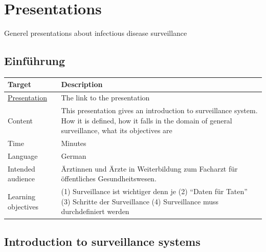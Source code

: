\documentclass[
  letterpaper,
  DIV=11,
  numbers=noendperiod]{scrreprt}
\begin{document}
\chapter*{Presentations}\label{presentations}


Generel presentations about infectious disease surveillance

\hfill\break

\section*{Einführung}\label{einfuxfchrung}


\begin{longtable}[]{@{}
  >{\raggedright\arraybackslash}p{}
  >{\raggedright\arraybackslash}p{}@{}}
\toprule\noalign{}
\begin{minipage}[b]{\linewidth}\raggedright
Target
\end{minipage} & \begin{minipage}[b]{\linewidth}\raggedright
Description
\end{minipage} \\
\midrule\noalign{}
\endhead
\bottomrule\noalign{}
\endlastfoot
\href{1_Presentations/presentation_einfuehrung.html}{Presentation} & The
link to the presentation \\
Content & This presentation gives an introduction to surveillance
system. How it is defined, how it falls in the domain of general
surveillance, what its objectives are \\
Time & 90 Minutes \\
Language & German \\
Intended audience & Ärztinnen und Ärzte in Weiterbildung zum Facharzt
für öffentliches Gesundheitswesen. \\
Learning objectives & (1) Surveillance ist wichtiger denn je (2) ``Daten
für Taten'' (3) Schritte der Surveillance (4) Surveillance muss
durchdefiniert werden \\
\end{longtable}

\section*{Introduction to surveillance
systems}\label{introduction-to-surveillance-systems}
\end{document}
